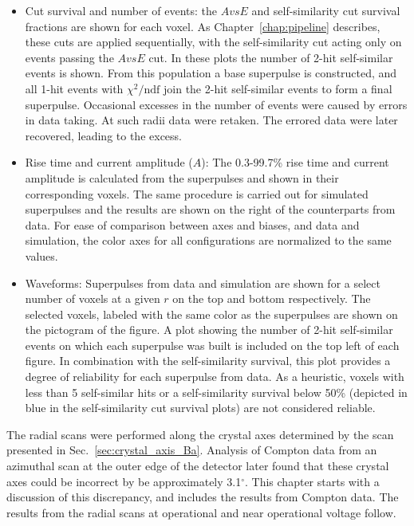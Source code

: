 \begin{itemize}
	\item Cut survival and number of events: the $AvsE$ and self-similarity cut survival fractions are shown for each voxel. As Chapter~\ref{chap:pipeline} describes, these cuts are applied sequentially, with the self-similarity cut acting only on events passing the $AvsE$ cut. In these plots the number of 2-hit self-similar events is shown. From this population a base superpulse is constructed, and all 1-hit events with $\chi^2/\text{ndf}$ join the 2-hit self-similar events to form a final superpulse. Occasional excesses in the number of events were caused by errors in data taking. At such radii data were retaken. The errored data were later recovered, leading to the excess. 
	\item Rise time and current amplitude ($A$): The 0.3-99.7\% rise time and current amplitude is calculated from the superpulses and shown in their corresponding voxels. The same procedure is carried out for simulated superpulses and the results are shown on the right of the counterparts from data. For ease of comparison between axes and biases, and data and simulation, the color axes for all configurations are normalized to the same values. 
	\item Waveforms: Superpulses from data and simulation are shown for a select number of voxels at a given $r$ on the top and bottom respectively. The selected voxels, labeled with the same color as the superpulses are shown on the pictogram of the figure. A plot showing the number of 2-hit self-similar events on which each superpulse was built is included on the top left of each figure. In combination with the self-similarity survival, this plot provides a degree of reliability for each superpulse from data. As a heuristic, voxels with less than 5 self-similar hits or a self-similarity survival below 50\% (depicted in blue in the self-similarity cut survival plots) are not considered reliable. 
\end{itemize}

The radial scans were performed along the crystal axes determined by the \BaS{} scan presented in Sec.~\ref{sec:crystal_axis_Ba}. Analysis of Compton data from an azimuthal scan at the outer edge of the detector later found that these crystal axes could be incorrect by be approximately 3.1$^\circ$. This chapter starts with a discussion of this discrepancy, and includes the results from Compton data. The results from the radial scans at operational and near operational voltage follow.

